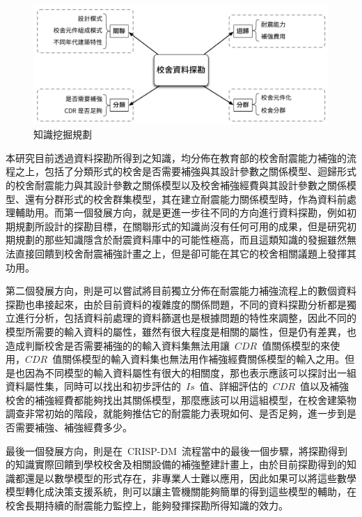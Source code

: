 \begin{figure}[hbtp]
  \begin{center}
    \includegraphics[width=1.0\textwidth]{figures/big-picture.pdf}
    \caption{知識挖掘規劃} 
    \label{fig:bigpicture}
  \end{center}
\end{figure}

本研究目前透過資料探勘所得到之知識，均分佈在教育部的校舍耐震能力補強的流程之上，包括了分類形式的校舍是否需要補強與其設計參數之關係模型、迴歸形式的校舍耐震能力與其設計參數之關係模型以及校舍補強經費與其設計參數之關係模型、還有分群形式的校舍群集模型，其在建立耐震能力關係模型時，作為資料前處理輔助用。而第一個發展方向，就是更進一步往不同的方向進行資料探勘，例如初期規劃所設計的探勘目標，在關聯形式的知識尚沒有任何可用的成果，但是研究初期規劃的那些知識隱含於耐震資料庫中的可能性極高，而且這類知識的發掘雖然無法直接回饋到校舍耐震補強計畫之上，但是卻可能在其它的校舍相關議題上發揮其功用。



第二個發展方向，則是可以嘗試將目前獨立分佈在耐震能力補強流程上的數個資料探勘也串接起來，由於目前資料的複雜度的關係問題，不同的資料探勘分析都是獨立進行分析，包括資料前處理的資料篩選也是根據問題的特性來調整，因此不同的模型所需要的輸入資料的屬性，雖然有很大程度是相關的屬性，但是仍有差異，也造成判斷校舍是否需要補強的的輸入資料集無法用讓~$CDR$~值關係模型的來使用，$CDR$~值關係模型的輸入資料集也無法用作補強經費關係模型的輸入之用。但是也因為不同模型的輸入資料屬性有很大的相關度，那也表示應該可以探討出一組資料屬性集，同時可以找出和初步評估的~$Is$~值、詳細評估的~$CDR$~值以及補強校舍的補強經費都能夠找出其關係模型，那麼應該可以用這組模型，在校舍建築物調查非常初始的階段，就能夠推估它的耐震能力表現如何、是否足夠，進一步到是否需要補強、補強經費多少。

最後一個發展方向，則是在~CRISP-DM~流程當中的最後一個步驟，將探勘得到的知識實際回饋到學校校舍及相關設備的補強整建計畫上，由於目前探勘得到的知識都還是以數學模型的形式存在，非專業人士難以應用，因此如果可以將這些數學模型轉化成決策支援系統，則可以讓主管機關能夠簡單的得到這些模型的輔助，在校舍長期持續的耐震能力監控上，能夠發揮探勘所得知識的效力。





